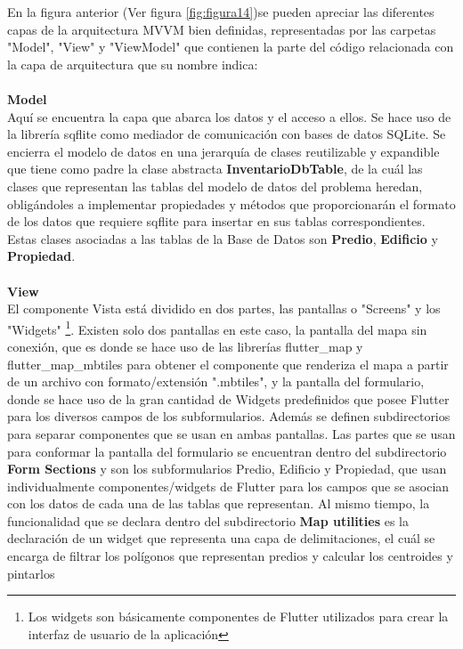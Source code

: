 En la figura anterior (Ver figura \ref{fig:figura14})se pueden apreciar las diferentes capas de la arquitectura MVVM bien definidas,
representadas por las carpetas "Model", "View" y "ViewModel" que contienen la parte del código relacionada con la capa de arquitectura
que su nombre indica:\\\\
\textbf{Model}\label{item:Model}\\
Aquí se encuentra la capa que abarca los datos y el acceso a ellos. Se hace uso de la librería sqflite \cite{sqflite} como mediador de comunicación
con bases de datos SQLite. Se encierra el modelo de datos en una jerarquía de clases reutilizable y expandible que tiene como padre la clase abstracta \textbf{InventarioDbTable},
de la cuál las clases que representan las tablas del modelo de datos del problema heredan, obligándoles a implementar propiedades y métodos que proporcionarán
el formato de los datos que requiere sqflite para insertar en sus tablas correspondientes. Estas clases asociadas a las tablas de la Base de Datos
son \textbf{Predio}, \textbf{Edificio} y \textbf{Propiedad}.
\\\\
\textbf{View}\\
El componente Vista está dividido en dos partes, las pantallas o "Screens" y los "Widgets"
\footnote{Los widgets son básicamente componentes de Flutter utilizados para crear la interfaz de usuario de
    la aplicación}.
Existen solo dos pantallas en este caso, la pantalla del mapa sin conexión, que es donde se hace uso de las librerías flutter\_map y flutter\_map\_mbtiles para
obtener el componente que renderiza el mapa a partir de un archivo con formato/extensión ".mbtiles", y la pantalla del formulario, donde se hace uso de la gran
cantidad de Widgets predefinidos que posee Flutter para los diversos campos de los subformularios. Además se definen subdirectorios para separar componentes que se
usan en ambas pantallas. Las partes que se usan para conformar la pantalla del formulario se encuentran dentro del subdirectorio \textbf{Form Sections} y son los
subformularios Predio, Edificio y Propiedad, que usan individualmente componentes/widgets de Flutter para los campos que se asocian con los datos de cada una de
las tablas que representan. Al mismo tiempo, la funcionalidad que se declara dentro del subdirectorio \textbf{Map utilities} es la declaración de un widget
que representa una capa de delimitaciones, el cuál se encarga de filtrar los polígonos que representan predios y calcular los centroides y pintarlos\\
